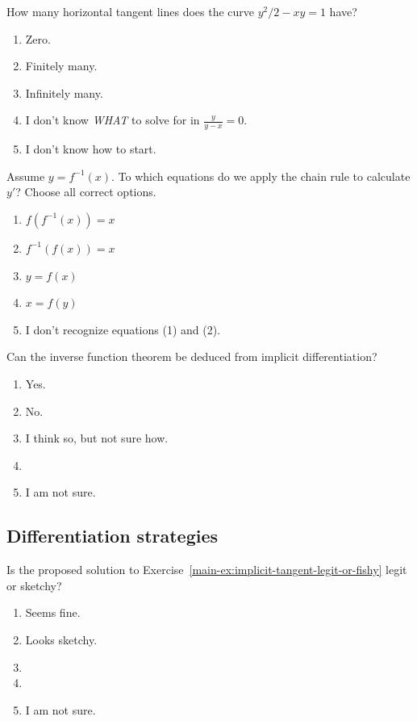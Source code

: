 \documentclass[aspectratio=169, 14pt, t]{beamer}  %
\begin{document}
\begin{poll}
  How many horizontal tangent lines does the curve \(y^{2}/2 - xy = 1\) have?

  \begin{enumerate}
    \item Zero.
    \item Finitely many.
    \item Infinitely many.
    \item I don't know \emph{WHAT} to solve for in \(\tfrac{y}{y - x} = 0\).
    \item I don't know how to start.
  \end{enumerate}
\end{poll}

\begin{poll}
  Assume \(y = f^{-1}(x)\). To which equations do we apply the chain rule to calculate \(y'\)? Choose all correct options.

  \begin{enumerate}
    \item \(f(f^{-1}(x)) = x\)
    \item \(f^{-1}(f(x)) = x\)
    \item \(y = f(x)\)
    \item \(x = f(y)\)
    \item I don't recognize equations (1) and (2).
  \end{enumerate}
\end{poll}

\begin{poll}
  Can the inverse function theorem be deduced from implicit differentiation?

  \begin{enumerate}
    \item Yes.
    \item No.
    \item I think so, but not sure how.
    \item
    \item I am not sure.
  \end{enumerate}
\end{poll}

\subsection{Differentiation strategies}

\begin{poll}
  Is the proposed solution to Exercise~\ref{main-ex:implicit-tangent-legit-or-fishy} legit or sketchy?

  \begin{enumerate}
    \item Seems fine.
    \item Looks sketchy.
    \item
    \item
    \item I am not sure.
  \end{enumerate}
\end{poll}
\end{document}
